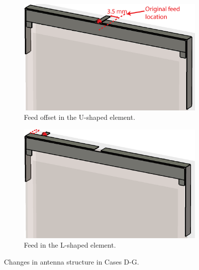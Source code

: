 \begin{figure}[H]
    \centering
    \begin{subfigure}[b]{0.49\textwidth}
        \includegraphics[width=\textwidth]{img/concept3_u_offset.eps}
        \caption{Feed offset in the U-shaped element.}
        \label{fig:concept3_u_offset}
    \end{subfigure}
    \begin{subfigure}[b]{0.49\textwidth}
        \includegraphics[width=\textwidth]{img/concept_l_feed.eps}
        \caption{Feed in the L-shaped element.}
        \label{fig:concept_l_feed}
    \end{subfigure}
    \caption{Changes in antenna structure in Cases D-G.}
    \label{fig:concept_offsets}
\end{figure}

